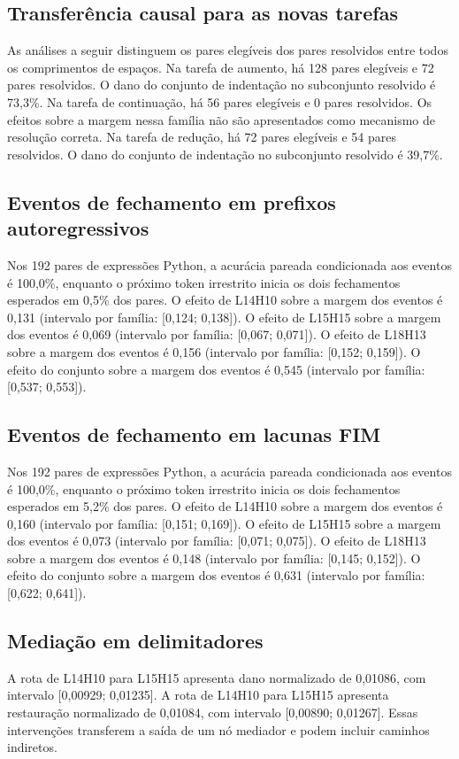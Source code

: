 \subsection{Transferência causal para as novas tarefas}
As análises a seguir distinguem os pares elegíveis dos pares resolvidos entre todos os comprimentos de espaços. 
Na tarefa de aumento, há 128 pares elegíveis e 72 pares resolvidos. 
O dano do conjunto de indentação no subconjunto resolvido é 73,3\%. 
Na tarefa de continuação, há 56 pares elegíveis e 0 pares resolvidos. 
Os efeitos sobre a margem nessa família não são apresentados como mecanismo de resolução correta. 
Na tarefa de redução, há 72 pares elegíveis e 54 pares resolvidos. 
O dano do conjunto de indentação no subconjunto resolvido é 39,7\%. 


\subsection{Eventos de fechamento em prefixos autoregressivos}
Nos 192 pares de expressões Python, a acurácia pareada condicionada aos eventos é 100,0\%, enquanto o próximo token irrestrito inicia os dois fechamentos esperados em 0,5\% dos pares. 
O efeito de L14H10 sobre a margem dos eventos é 0,131 (intervalo por família: [0,124; 0,138]). 
O efeito de L15H15 sobre a margem dos eventos é 0,069 (intervalo por família: [0,067; 0,071]). 
O efeito de L18H13 sobre a margem dos eventos é 0,156 (intervalo por família: [0,152; 0,159]). 
O efeito do conjunto sobre a margem dos eventos é 0,545 (intervalo por família: [0,537; 0,553]). 


\subsection{Eventos de fechamento em lacunas FIM}
Nos 192 pares de expressões Python, a acurácia pareada condicionada aos eventos é 100,0\%, enquanto o próximo token irrestrito inicia os dois fechamentos esperados em 5,2\% dos pares. 
O efeito de L14H10 sobre a margem dos eventos é 0,160 (intervalo por família: [0,151; 0,169]). 
O efeito de L15H15 sobre a margem dos eventos é 0,073 (intervalo por família: [0,071; 0,075]). 
O efeito de L18H13 sobre a margem dos eventos é 0,148 (intervalo por família: [0,145; 0,152]). 
O efeito do conjunto sobre a margem dos eventos é 0,631 (intervalo por família: [0,622; 0,641]). 


\subsection{Mediação em delimitadores}
A rota de L14H10 para L15H15 apresenta dano normalizado de 0,01086, com intervalo [0,00929; 0,01235]. 
A rota de L14H10 para L15H15 apresenta restauração normalizado de 0,01084, com intervalo [0,00890; 0,01267]. 
Essas intervenções transferem a saída de um nó mediador e podem incluir caminhos indiretos.

